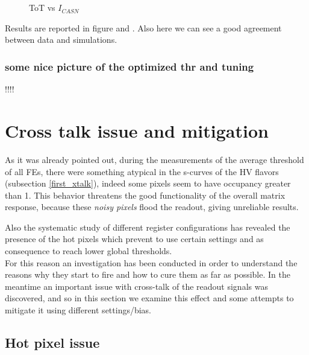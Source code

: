\begin{figure}[h!]
\centering
{}\\%
{}\\
\caption{ToT vs $I_{CASN}$}
\label{fig:tot_vs_icasn}
\end{figure}

Results are reported in figure  and . Also here we can see a good agreement between data and simulations.

\subsubsection{some nice picture of the optimized thr and tuning}

!!!!


\section{Cross talk issue and mitigation} \label{sec:xtalk}

As it was already pointed out, during the measurements of the average threshold of all FEs, there were something atypical in the s-curves of the HV flavors (subsection \vref{first_xtalk}), indeed some pixels seem to have occupancy greater than 1. This behavior threatens the good functionality of the overall matrix response, because these \textit{noisy pixels} flood the readout, giving unreliable results.

Also the systematic study of different register configurations has revealed the presence of the hot pixels which prevent to use certain settings and as consequence to reach lower global thresholds. \\

For this reason an investigation has been conducted in order to understand the reasons why they start to fire and how to cure them as far as possible.
In the meantime an important issue with cross-talk of the readout signals was discovered, and so in this section we examine this effect and some attempts to mitigate it using different settings/bias.


\subsection{Hot pixel issue}

